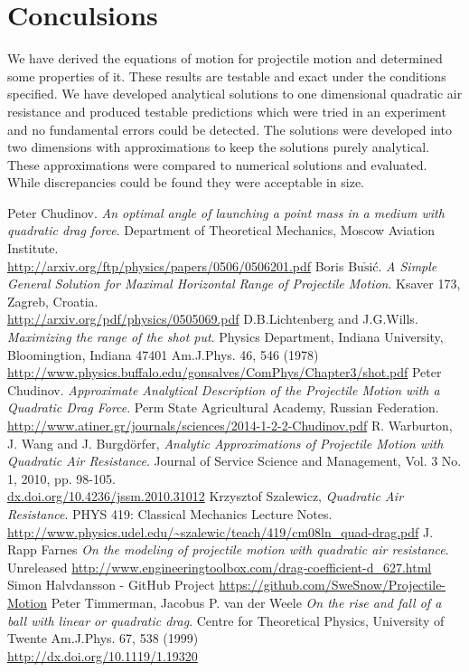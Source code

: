 \documentclass[%
aip,
jmp,
amsmath,amssymb,
reprint,%
]{revtex4-1}
\begin{document}
	\section{Conculsions}
	We have derived the equations of motion for projectile motion and determined some properties of it. These results are testable and exact under the conditions specified. We have developed analytical solutions to one dimensional quadratic air resistance and produced testable predictions which were tried in an experiment and no fundamental errors could be detected. The solutions were developed into two dimensions with approximations to keep the solutions purely analytical. These approximations were compared to numerical solutions and evaluated. While discrepancies could be found they were acceptable in size.
	\begin{thebibliography}{7}
		Peter Chudinov. \textit{An optimal angle of launching a point mass in a medium with quadratic drag force}.
		Department of Theoretical Mechanics, Moscow Aviation Institute.
		\\\url{http://arxiv.org/ftp/physics/papers/0506/0506201.pdf}
		Boris Bu$\check{\mathrm{s}}$i\'{c}. \textit{A Simple General Solution for Maximal Horizontal Range of Projectile Motion}.
		Ksaver 173, Zagreb, Croatia.
		\\\url{http://arxiv.org/pdf/physics/0505069.pdf}
		D.B.Lichtenberg and J.G.Wills. \textit{Maximizing the range of the shot put}.
		Physics Department, Indiana University, Bloomingtion, Indiana 47401
		Am.J.Phys. 46, 546 (1978)
		\\\url{http://www.physics.buffalo.edu/gonsalves/ComPhys/Chapter3/shot.pdf}
		Peter Chudinov. \textit{Approximate Analytical Description of the Projectile Motion with a Quadratic Drag Force}.
		Perm State Agricultural Academy, Russian Federation.
		\\\url{http://www.atiner.gr/journals/sciences/2014-1-2-2-Chudinov.pdf}
		R. Warburton, J. Wang and J. Burgdörfer, \textit{Analytic Approximations of Projectile Motion with Quadratic Air Resistance}.
		Journal of Service Science and Management, Vol. 3 No. 1, 2010, pp. 98-105. \\\url{dx.doi.org/10.4236/jssm.2010.31012}
		Krzysztof Szalewicz, \textit{Quadratic Air Resistance}.
		PHYS 419: Classical Mechanics Lecture Notes.
		\\\url{http://www.physics.udel.edu/~szalewic/teach/419/cm08ln_quad-drag.pdf}
		J. Rapp Farnes \textit{On the modeling of projectile motion with quadratic air resistance}.
		Unreleased
		\url{http://www.engineeringtoolbox.com/drag-coefficient-d_627.html}
		Simon Halvdansson - GitHub Project
		\url{https://github.com/SweSnow/Projectile-Motion}
		Peter Timmerman, Jacobus P. van der Weele \textit{On the rise and fall of a ball with linear or quadratic drag}.
		Centre for Theoretical Physics, University of Twente
		Am.J.Phys. 67, 538 (1999)
		\\\url{http://dx.doi.org/10.1119/1.19320}
	\end{thebibliography}
\end{document}
